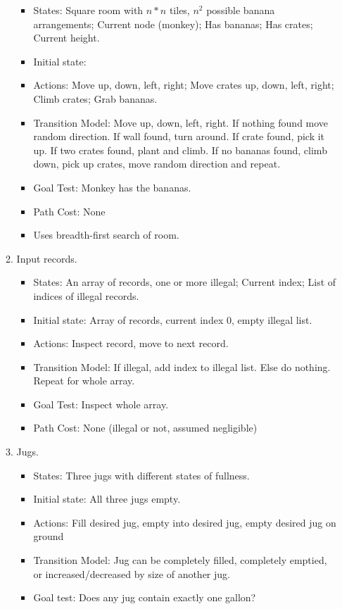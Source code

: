 \documentclass[10pt]{article}
\begin{document}
\begin{enumerate}
\begin{enumerate}
\begin{itemize}
    \item States: Square room with $n*n$ tiles, $n^2$ possible banana
      arrangements; Current node (monkey); Has bananas; Has crates;
      Current height.
    \item Initial state: 
    \item Actions: Move up, down, left, right; Move crates up, down,
      left, right; Climb crates; Grab bananas.
    \item Transition Model: Move up, down, left, right. If nothing
      found move random direction. If wall found, turn around. If
      crate found, pick it up. If two crates found, plant and
      climb. If no bananas found, climb down, pick up crates, move
      random direction and repeat.
    \item Goal Test: Monkey has the bananas.
    \item Path Cost: None
    \item Uses breadth-first search of room.
    \end{itemize}
  \item Input records.
    \begin{itemize}
    \item States: An array of records, one or more illegal; Current
      index; List of indices of illegal records.
    \item Initial state: Array of records, current index 0, empty illegal list.
    \item Actions: Inspect record, move to next record.
    \item Transition Model: If illegal, add index to illegal
      list. Else do nothing. Repeat for whole array.
    \item Goal Test: Inspect whole array.
    \item Path Cost: None (illegal or not, assumed negligible)
    \end{itemize}  
  \item Jugs.
    \begin{itemize}
    \item States: Three jugs with different states of fullness.
    \item Initial state: All three jugs empty.
    \item Actions: Fill desired jug, empty into desired jug, empty
      desired jug on ground
    \item Transition Model: Jug can be completely filled, completely
      emptied, or increased/decreased by size of another jug.
    \item Goal test: Does any jug contain exactly one gallon?

\end{itemize}
\end{enumerate}
\end{enumerate}
\end{document}
